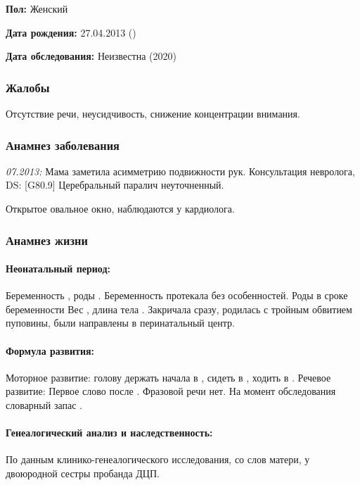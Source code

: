 \documentclass[a4paper,14pt]{extarticle}
\newcommand{\gramm}{г}
\newcommand{\cm}{см}
\newcommand{\months}{мес.}
\newcommand{\weeks}{нед.}
\newcommand{\pdate}[1]{\emph{#1:} }
\newcommand{\DS}[2]{[#2] #1}
\begin{document}
\textbf{Пол:} Женский

\textbf{Дата рождения:} 27.04.2013 ()

\textbf{Дата обследования:} Неизвестна (2020)

\subsubsection*{Жалобы}

Отсутствие речи, неусидчивость, снижение концентрации внимания.

\subsubsection*{Анамнез заболевания}

\pdate{07.2013} Мама заметила асимметрию подвижности рук. Консультация невролога, DS: \DS{Церебральный паралич неуточненный}{G80.9}.

Открытое овальное окно, наблюдаются у кардиолога.

\subsubsection*{Анамнез жизни}

\paragraph{Неонатальный период:} Беременность , роды .
Беременность протекала без особенностей. Роды в сроке беременности \numprint[\weeks]{41} Вес \numprint[\gramm]{3800}, длина тела \numprint[\cm]{54}. Закричала сразу, родилась с тройным обвитием пуповины, были направлены в перинатальный центр.

\paragraph{Формула развития:} Моторное развитие: голову держать начала в \numprint[\months]{3.5}, сидеть в \numprint[\months]{10}, ходить в .
Речевое развитие: Первое слово после . Фразовой речи нет. На момент обследования словарный запас .

\paragraph{Генеалогический анализ и наследственность:} По данным клинико\hyp{}генеалогического исследования, со слов матери, у двоюродной сестры пробанда ДЦП.
\end{document}
